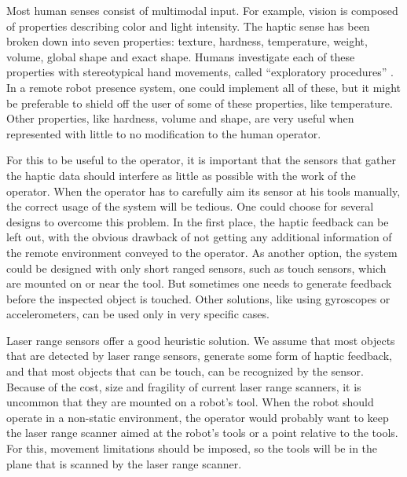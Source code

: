 
Most human senses consist of multimodal input. For example, vision is composed of properties describing color and light intensity.  The haptic sense has been broken down into seven properties: texture, hardness, temperature, weight, volume, global shape and exact shape.  Humans investigate each of these properties with stereotypical hand movements, called ``exploratory procedures'' \cite{Lederman1993}.  In a remote robot presence system, one could implement all of these, but it might be preferable to shield off the user of some of these properties, like temperature.  Other properties, like hardness, volume and shape, are very useful when represented with little to no modification to the human operator.  

For this to be useful to the operator, it is important that the sensors that gather the haptic data should interfere as little as possible with the work of the operator.  When the operator has to carefully aim its sensor at his tools manually, the correct usage of the system will be tedious.  One could choose for several designs to overcome this problem.  In the first place, the haptic feedback can be left out, with the obvious drawback of not getting any additional information of the remote environment conveyed to the operator.  As another option, the system could be designed with only short ranged sensors, such as touch sensors, which are mounted on or near the tool.  But sometimes one needs to generate feedback before the inspected object is touched.  Other solutions, like using gyroscopes or accelerometers, can be used only in very specific cases.  

Laser range sensors offer a good heuristic solution.  We assume that most objects that are detected by laser range sensors, generate some form of haptic feedback, and that most objects that can be touch, can be recognized by the sensor.  Because of the cost, size and fragility of current laser range scanners, it is uncommon that they are mounted on a robot's tool.  When the robot should operate in a non-static environment, the operator would probably want to keep the laser range scanner aimed at the robot's tools or a point relative to the tools.  For this, movement limitations should be imposed, so the tools will be in the plane that is scanned by the laser range scanner.


